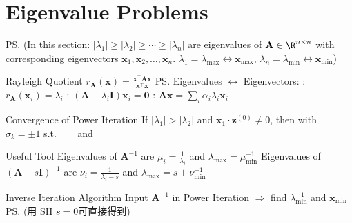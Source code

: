 \documentclass{note}
\begin{document}
\section{Eigenvalue Problems}

\vspace{-8pt}\hspace{120pt}\ps{\tiny (In this section: $|\lambda_1|\ge|\lambda_2|\ge\cdots\ge|\lambda_n|$ are eigenvalues of $\mathbf{A}\in\R^{n\times n}$ with corresponding eigenvectors $\mathbf{x}_1,\mathbf{x}_2,\ldots,\mathbf{x}_n$. $\lambda_1=\lambda_{\max}\leftrightarrow\mathbf{x}_{\max}$, $\lambda_n=\lambda_{\min}\leftrightarrow\mathbf{x}_{\min}$)}

\begin{MyTh}{Rayleigh Quotient}
  $r_{\mathbf{A}}(\mathbf{x})=\frac{\mathbf{x}^\top \mathbf{A} \mathbf{x}}{\mathbf{x}^\top \mathbf{x}}$ \qquad {} \qquad \ps{Eigenvalues $\leftrightarrow$ Eigenvectors}: : $r_{\mathbf{A}}(\mathbf{x}_i)=\lambda_i$ \quad {}: $(\mathbf{A}-\lambda_i\mathbf{I})\mathbf{x}_i=\mathbf{0}$ \quad {}: $\mathbf{A}\mathbf{x}=\sum_i \alpha_i \lambda_i \mathbf{x}_i$
\end{MyTh}

\begin{MyTh}{Convergence of Power Iteration}
  If $|\lambda_1|>|\lambda_2|$ and $\mathbf{x}_1\cdot \mathbf{z}^{(0)}\ne0$, then  with $\sigma_k=\pm1$ s.t. \  \ \ and \ \ 
\end{MyTh}

\vspace{-3pt}
\begin{MyTh}{Useful Tool}
  Eigenvalues of $\mathbf{A}^{-1}$ are $\mu_i=\frac{1}{\lambda_i}$ and $\lambda_{\max}=\mu_{\min}^{-1}$ \qquad Eigenvalues of $(\mathbf{A}-s\mathbf{I})^{-1}$ are $\nu_i=\frac{1}{\lambda_i - s}$ and $\lambda_{\max} = s + \nu_{\min}^{-1}$
\end{MyTh}

\vspace{-2pt}
\begin{MyTh}{Inverse Iteration Algorithm}
  Input $\mathbf{A}^{-1}$ in Power Iteration $\Rightarrow$ find $\lambda_{\min}^{-1}$ and $\mathbf{x}_{\min}$ \ps{\tiny (用 SII $s=0$可直接得到)}
\end{MyTh}
\end{document}
